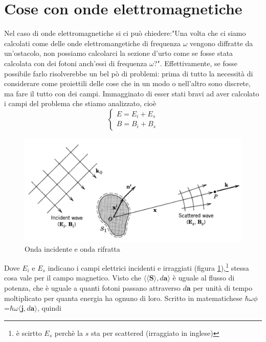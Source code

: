\documentclass[11pt,a4paper]{article}
\newcommand{\vettore}[1]{\mathbf{#1}}
\newcommand{\pscal}[2]{\langle #1,#2\rangle}
\begin{document}
	\section{Cose con onde elettromagnetiche}
		Nel caso di onde elettromagnetiche si ci può chiedere:"Una volta che ci siamo calcolati come delle onde elettromangetiche di frequenza $\omega$ vengono diffratte da un'ostacolo, non possiamo calcolarci la sezione d'urto come se fosse stata calcolata con dei fotoni anch'essi di frequenza $\omega$?".\newline
		Effettivamente, se fosse possibile farlo risolverebbe un bel pò di problemi: prima di tutto la necessità di considerare come proiettili delle cose che in un modo o nell'altro sono discrete, ma fare il tutto con dei campi.\newline
		Immagginato di esser stati bravi ad aver calcolato i campi del problema che stiamo analizzato, cioè
		\[
			\begin{cases}
				E=E_{i}+E_{s}\\
				B=B_{i}+B_{s}

			\end{cases}
		\]
		\begin{figure}
			\centering
    		\includegraphics[width=\linewidth]{Immagini/irraggiamento.png}
    		\caption{Onda incidente e onda rifratta}
    		\label{fig:irr}
		\end{figure}
		Dove $E_{i}$ e $E_{s}$ indicano i campi elettrici incidenti e irraggiati (figura \ref{fig:irr}),\footnote{è scirtto $E_s$ perchè la $s$ sta per scattered (irraggiato in inglese)} stessa cosa vale per il campo magnetico.\newline
		Visto che $\pscal{\langle\vettore S \rangle}{d\vettore{a}}$ è uguale al flusso di potenza, che è uguale a quanti fotoni passano attraverso $d\vettore a$ per unità di tempo moltiplicato per quanta energia ha ognuno di loro. Scritto in matematichese $\hbar \omega \phi$=$\hbar \omega \pscal{\vettore j}{d\vettore a}$, quindi
\end{document}
